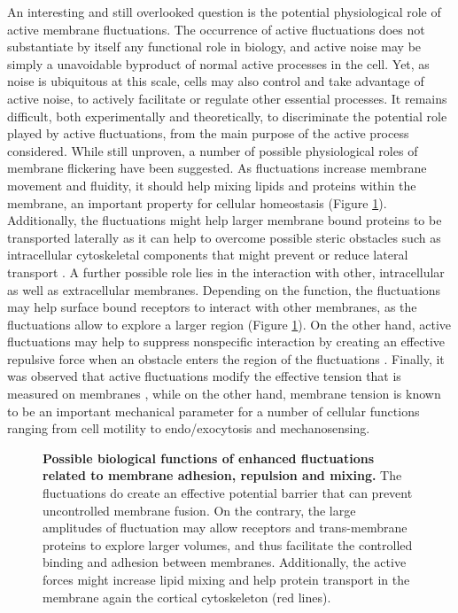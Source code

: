 \documentclass[graybox]{svmult}
\begin{document}
An interesting and still overlooked question is the potential physiological role of active membrane fluctuations. The occurrence of active fluctuations does not substantiate by itself any functional role in biology, and active noise may be simply a unavoidable byproduct of normal active processes in the cell. Yet, as noise is ubiquitous at this scale, cells may also control and take advantage of active noise, to actively facilitate or regulate other essential processes. It remains difficult, both experimentally and theoretically, to discriminate the potential role played by active fluctuations, from the main purpose of the active process considered. While still unproven, a number of possible physiological roles of membrane flickering have been suggested. As fluctuations increase membrane movement and fluidity, it should help mixing lipids and proteins within the membrane, an important property for cellular homeostasis (Figure \ref{fig:fig9})\cite{Lin:2004}. Additionally, the fluctuations might help larger membrane bound proteins to be transported laterally as it can help to overcome possible steric obstacles such as intracellular cytoskeletal components that might prevent or reduce lateral transport \cite{Lin:2004}. A further possible role lies in the interaction with other, intracellular as well as extracellular membranes. Depending on the function, the fluctuations may help surface bound receptors to interact with other membranes, as the fluctuations allow to explore a larger region (Figure \ref{fig:fig9}). On the other hand, active fluctuations may help to suppress nonspecific interaction by creating an effective repulsive force when an obstacle enters the region of the fluctuations \cite{Evans:1986,Prost:1998}. Finally, it was observed that active fluctuations modify the effective tension that is measured on membranes \cite{Betz:2009}, while on the other hand, membrane tension is known to be an important mechanical parameter for a number of cellular functions ranging from cell motility to endo/exocytosis and mechanosensing.

\begin{figure}[h]
	\caption{\textbf{Possible biological functions of enhanced fluctuations related to membrane adhesion, repulsion and mixing.} The fluctuations do create an effective potential barrier that can prevent uncontrolled membrane fusion. On the contrary, the large amplitudes of fluctuation may allow receptors and trans-membrane proteins to explore larger volumes, and thus facilitate the controlled binding and adhesion between membranes. Additionally, the active forces might increase lipid mixing and help protein transport in the membrane again the cortical cytoskeleton (red lines).    }
	\label{fig:fig9}
\end{figure}	
\end{document}
